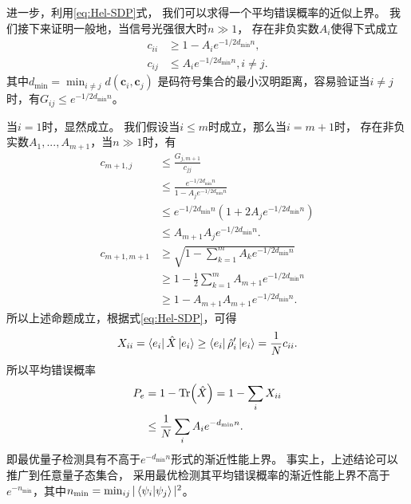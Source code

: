 进一步，利用\ref{eq:Hel-SDP}式，
我们可以求得一个平均错误概率的近似上界。
我们接下来证明一般地，当信号光强很大时$n \gg 1$，
存在非负实数$A_i$使得下式成立
\begin{equation}
\begin{split}
c_{ii} & \ge 1 - A_i e^{-1/2 d_{\min} n}, \\
c_{ij} & \le A_i e^{-1/2 d_{\min} n}, i\neq j.
\end{split}
\end{equation}
其中$d_{\min} = \min_{i \neq j} d(\bm{c}_i , \bm{c}_j)$
是码符号集合的最小汉明距离，容易验证当$i \neq j$时，有$G_{ij} \le e^{-1/2 d_{\min} n}$。

当$i=1$时，显然成立。
我们假设当$i\le m$时成立，那么当$i=m+1$时，
存在非负实数$A_1, ..., A_{m+1}$，当$n \gg 1$时，有
\begin{equation}
\begin{split}
c_{m+1,j} & \le \frac{G_{j,m+1}}{c_{jj}} \\
       & \le \frac{e^{-1/2 d_{\min} n}}{1 - A_j e^{-1/2 d_{\min} n}}   \\
       & \le e^{-1/2 d_{\min} n} \left(  1 + 2 A_j e^{-1/2 d_{\min} n} \right)  \\
       & \le A_{m+1} A_j e^{-1/2 d_{\min} n}. \\
c_{m+1,m+1} &\ge \sqrt{1 - \sum_{k=1}^{m} A_k e^{-1/2 d_{\min} n} } \\
            &\ge 1 - \frac{1}{2}\sum_{k=1}^{m} A_{m+1} e^{-1/2 d_{\min} n} \\
            &\ge 1 - A_{m+1} A_{m+1} e^{-1/2 d_{\min} n}.
\end{split}
\end{equation}
所以上述命题成立，根据式\ref{eq:Hel-SDP}，可得
\begin{equation}
\begin{split}
X_{ii} = \bra{e_i} \hat{X} \ket{e_i} \ge \bra{e_i} \hat{\rho}_i' \ket{e_i} = \frac{1}{N} c_{ii}  .
\end{split}
\end{equation}
所以平均错误概率
\begin{equation}
\begin{split}
P_e &= 1 - \Tr(\hat{X}) =  1 - \sum_i X_{ii} \\
    &\le \frac{1}{N} \sum_i A_i e^{- d_{\min} n}.
\end{split}
\end{equation}
即最优量子检测具有不高于$e^{- d_{\min} n}$形式的渐近性能上界。
事实上，上述结论可以推广到任意量子态集合，
采用最优检测其平均错误概率的渐近性能上界不高于
$e^{-n_{\min}}$，其中$n_{\min} = \min_{ij} |\bra{\psi_i}\ket{\psi_j}|^2$。

